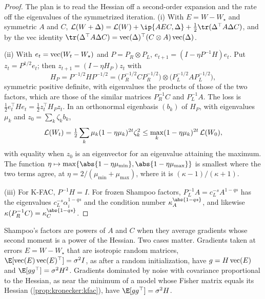 \begin{refsection}
\begin{proof}
The plan is to read the Hessian off a second-order expansion and the rate off the eigenvalues of the symmetrized iteration. (i) With $E=W-W_\star$ and symmetric $A$ and $C$, $\Loss(W+\Delta)=\Loss(W)+\ip{AEC,\Delta}+\frac12\tr(\Delta^\top A\Delta C)$, and by the vec identity $\tr(\Delta^\top A\Delta C)=\vect(\Delta)^\top(C\otimes A)\vect(\Delta)$.

(ii) With $e_t=\operatorname{vec}(W_t-W_\star)$ and $P=P_R\otimes P_L$, $e_{t+1}=(I-\eta P^{-1}H)e_t$. Put $z_t=P^{1/2}e_t$; then $z_{t+1}=(I-\eta H_P)z_t$ with
\[
  H_P=P^{-1/2}HP^{-1/2}=\bigl(P_R^{-1/2}CP_R^{-1/2}\bigr)\otimes\bigl(P_L^{-1/2}AP_L^{-1/2}\bigr),
\]
symmetric positive definite, with eigenvalues the products of those of the two factors, which are those of the similar matrices $P_R^{-1}C$ and $P_L^{-1}A$. The loss is $\frac12e_t^\top He_t=\frac12z_t^\top H_Pz_t$. In an orthonormal eigenbasis $(b_k)$ of $H_P$, with eigenvalues $\mu_k$ and $z_0=\sum_k\zeta_kb_k$,
\[
  \mathcal{L}(W_t)=\tfrac12\sum_k\mu_k(1-\eta\mu_k)^{2t}\zeta_k^2\le\max_k(1-\eta\mu_k)^{2t}\,\mathcal{L}(W_0),
\]
with equality when $z_0$ is an eigenvector for an eigenvalue attaining the maximum. The function $\eta\mapsto\max\{\abs{1-\eta\mu_{\min}},\abs{1-\eta\mu_{\max}}\}$ is smallest where the two terms agree, at $\eta=2/(\mu_{\min}+\mu_{\max})$, where it is $(\kappa-1)/(\kappa+1)$.

(iii) For K-FAC, $P^{-1}H=I$. For frozen Shampoo factors, $P_L^{-1}A=c_L^{-s}A^{1-qs}$ has the eigenvalues $c_L^{-s}\alpha_i^{1-qs}$ and the condition number $\kappa_A^{\abs{1-qs}}$, and likewise $\kappa(P_R^{-1}C)=\kappa_C^{\abs{1-qs}}$.
\end{proof}

Shampoo's factors are powers of $A$ and $C$ when they average gradients whose second moment is a power of the Hessian. Two cases matter. Gradients taken at errors $E=W-W_\star$ that are isotropic random matrices, $\E[\vect(E)\vect(E)^\top]=\sigma^2I$, as after a random initialization, have $g=H\operatorname{vec}(E)$ and $\E[gg^\top]=\sigma^2H^2$. Gradients dominated by noise with covariance proportional to the Hessian, as near the minimum of a model whose Fisher matrix equals its Hessian (\cref{prop:kronecker:kfac}), have $\E[gg^\top]=\sigma^2H$.



\end{refsection}
